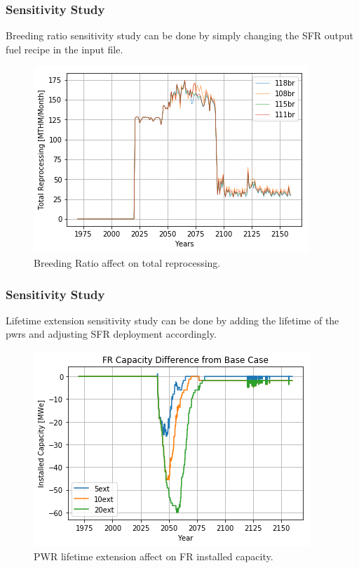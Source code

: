 \begin{frame}
    \frametitle{Sensitivity Study}
    Breeding ratio sensitivity study can be done by simply changing the 
    SFR output fuel recipe in the input file.
    \begin{figure}[htbp!]
        \begin{center}
                \includegraphics[width=.8\textwidth]{./images/sim_output/br_tot_rep.png}
        \end{center}
    \caption{Breeding Ratio affect on total reprocessing.}
    \end{figure}
\end{frame}

\begin{frame}
    \frametitle{Sensitivity Study}
    Lifetime extension sensitivity study can be done by adding the
    lifetime of the pwrs and adjusting SFR deployment accordingly.
    \begin{figure}[htbp!]
        \begin{center}
                \includegraphics[width=.8\textwidth]{./images/sim_output/fr_diff.png}
        \end{center}
    \caption{PWR lifetime extension affect on FR installed capacity.}
    \end{figure}
\end{frame}
